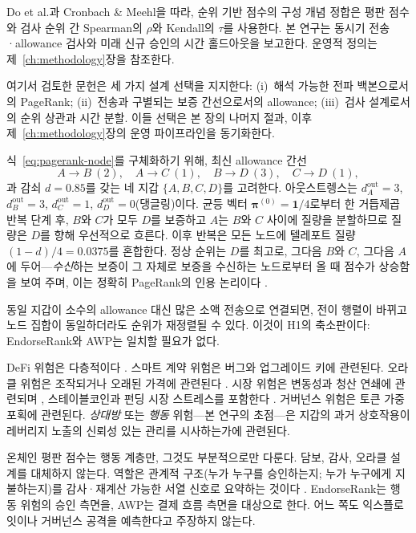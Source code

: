 Do et al.과 Cronbach \& Meehl을 따라, 순위 기반 점수의 구성 개념 정합은 평판 점수와 검사 순위 간 Spearman의 $\rho$와 Kendall의 $\tau$를 사용한다. 본 연구는 동시기 전송·allowance 검사와 미래 신규 승인의 시간 홀드아웃을 보고한다. 운영적 정의는 제~\ref{ch:methodology}장을 참조한다.

여기서 검토한 문헌은 세 가지 설계 선택을 지지한다: (i)~해석 가능한 전파 백본으로서의 PageRank; (ii)~전송과 구별되는 보증 간선으로서의 allowance; (iii)~검사 설계로서의 순위 상관과 시간 분할. 이들 선택은 본 장의 나머지 절과, 이후 제~\ref{ch:methodology}장의 운영 파이프라인을 동기화한다.


식~\eqref{eq:pagerank-node}를 구체화하기 위해, 최신 allowance 간선
\[
A\to B\ (2),\quad A\to C\ (1),\quad B\to D\ (3),\quad C\to D\ (1),
\]
과 감쇠 $d=0.85$를 갖는 네 지갑 $\{A,B,C,D\}$를 고려한다. 아웃스트렝스는 $d_A^{\mathrm{out}}=3$, $d_B^{\mathrm{out}}=3$, $d_C^{\mathrm{out}}=1$, $d_D^{\mathrm{out}}=0$(댕글링)이다. 균등 벡터 $\boldsymbol{\pi}^{(0)}=\mathbf{1}/4$로부터 한 거듭제곱 반복 단계 후, $B$와 $C$가 모두 $D$를 보증하고 $A$는 $B$와 $C$ 사이에 질량을 분할하므로 질량은 $D$를 향해 우선적으로 흐른다. 이후 반복은 모든 노드에 텔레포트 질량 $(1-d)/4=0.0375$를 혼합한다. 정상 순위는 $D$를 최고로, 그다음 $B$와 $C$, 그다음 $A$에 두어---\emph{수신}하는 보증이 그 자체로 보증을 수신하는 노드로부터 올 때 점수가 상승함을 보여 주며, 이는 정확히 PageRank의 인용 논리이다 .

동일 지갑이 소수의 allowance 대신 많은 소액 전송으로 연결되면, 전이 행렬이 바뀌고 노드 집합이 동일하더라도 순위가 재정렬될 수 있다. 이것이 H1의 축소판이다: EndorseRank와 AWP는 일치할 필요가 없다.


DeFi 위험은 다층적이다 . 스마트 계약 위험은 버그와 업그레이드 키에 관련된다. 오라클 위험은 조작되거나 오래된 가격에 관련된다 . 시장 위험은 변동성과 청산 연쇄에 관련되며 , 스테이블코인과 펀딩 시장 스트레스를 포함한다 . 거버넌스 위험은 토큰 가중 포획에 관련된다. \emph{상대방} 또는 \emph{행동} 위험---본 연구의 초점---은 지갑의 과거 상호작용이 레버리지 노출의 신뢰성 있는 관리를 시사하는가에 관련된다.

온체인 평판 점수는 행동 계층만, 그것도 부분적으로만 다룬다. 담보, 감사, 오라클 설계를 대체하지 않는다. 역할은 관계적 구조(누가 누구를 승인하는지; 누가 누구에게 지불하는지)를 감사·재계산 가능한 서열 신호로 요약하는 것이다 . EndorseRank는 행동 위험의 승인 측면을, AWP는 결제 흐름 측면을 대상으로 한다. 어느 쪽도 익스플로잇이나 거버넌스 공격을 예측한다고 주장하지 않는다.

